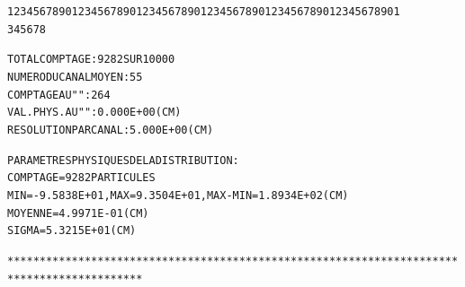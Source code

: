 \begin{alltt}
                              1234567890123456789012345678901234567890123456789012345678901
                                       3         4         5         6         7         8


                TOTAL  COMPTAGE                 :    9282  SUR  10000
                NUMERO   DU  CANAL  MOYEN       :      55
                COMPTAGE  AU   "      "         :     264
                VAL. PHYS. AU  "      "         :  0.000E+00 (CM) 
                RESOLUTION  PAR  CANAL          :  5.000E+00 (CM) 

                PARAMETRES  PHYSIQUES  DE  LA  DISTRIBUTION :
                              COMPTAGE =   9282  PARTICULES
                              MIN= -9.5838E+01, MAX = 9.3504E+01, MAX-MIN = 1.8934E+02 (CM) 
                              MOYENNE =  4.9971E-01 (CM) 
                              SIGMA =  5.3215E+01 (CM) 

*******************************************************************************************

\end{alltt}

\newpage

